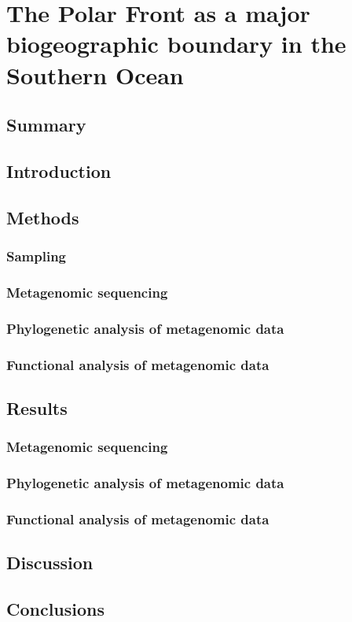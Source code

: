\chapter{The Polar Front as a major biogeographic boundary in the Southern Ocean} 
\label{ch:polarfront}

\section{Summary}

\section{Introduction}

\section{Methods}
\subsection{Sampling}
\subsection{Metagenomic sequencing}
\subsection{Phylogenetic analysis of metagenomic data}
\subsection{Functional analysis of metagenomic data}

\section{Results}
\subsection{Metagenomic sequencing}
\subsection{Phylogenetic analysis of metagenomic data}
\subsection{Functional analysis of metagenomic data}

\section{Discussion}

\section{Conclusions}
